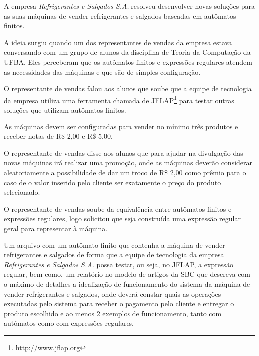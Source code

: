 A empresa \textit{Refrigerantes e Salgados S.A.} resolveu desenvolver novas soluções
para as suas máquinas de vender refrigerantes e salgados
baseadas em autômatos finitos.

A ideia surgiu quando um dos representantes de vendas da empresa estava conversando
com um grupo de alunos da disciplina de Teoria da Computação da UFBA.
Eles perceberam que os autômatos finitos e expressões regulares
atendem as necessidades das máquinas e que são
de simples configuração.



O representante de vendas falou aos alunos que soube que a equipe de tecnologia
da empresa utiliza uma ferramenta chamada de JFLAP\footnote{http://www.jflap.org}
para testar outras soluções que utilizam autômatos finitos.

As máquinas devem ser configuradas para vender no mínimo três produtos e
receber notas de R\$ 2,00 e R\$ 5,00.

O representante de vendas disse aos alunos que para ajudar na divulgação
das novas máquinas irá realizar uma promoção, onde as máquinas deverão
considerar aleatoriamente a possibilidade de dar um troco de R\$ 2,00
como prêmio para o caso de o valor inserido pelo cliente ser exatamente
o preço do produto selecionado.

O representante de vendas soube da equivalência entre autômatos finitos
e expressões regulares, logo solicitou que seja construída uma expressão
regular geral para representar à máquina.

Um arquivo com um autômato finito que contenha a máquina de vender
refrigerantes e salgados de forma que a equipe de tecnologia da
empresa \textit{Refrigerantes e Salgados S.A.} possa testar, ou seja, no JFLAP,
a expressão regular, bem como, um relatório no modelo de
artigos da SBC que descreva com o máximo de detalhes a idealização de funcionamento do
sistema da máquina de vender refrigerantes e salgados, onde deverá
constar quais as operações executadas pelo sistema para receber o pagamento pelo cliente e entregar o
produto escolhido e ao menos 2 exemplos de funcionamento, tanto com autômatos
como com expressões regulares.

